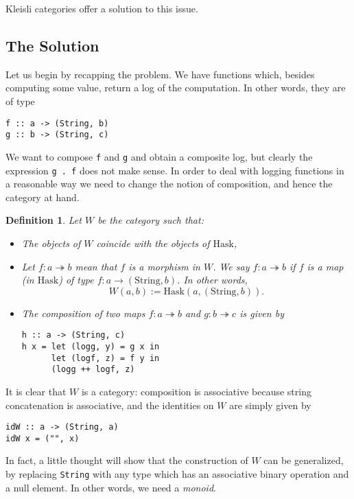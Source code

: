 \documentclass[11	pt]{article}
\newtheorem{definition}{Definition}
\theoremstyle{nonumberplain}
\newcommand{\Hask}{\mathrm{Hask}}
\newcommand{\type}[1]{\mathrm{#1}}
\newcommand*\lsin{\lstinline}
\begin{document}
Kleisli categories offer a solution to this issue.

\subsection{The Solution}

Let us begin by recapping the problem. We have functions which, besides computing some value, return a log of the computation. In other words, they are of type
\begin{lstlisting}
f :: a -> (String, b)
g :: b -> (String, c)
\end{lstlisting}

We want to compose \lsin|f| and \lsin|g| and obtain a composite log, but clearly the expression \lsin|g . f| does not make sense. In order to deal with logging functions in a reasonable way we need to change the notion of composition, and hence the category at hand.

\begin{definition}\label{def:kleisli}
Let $W$ be the category such that:
\begin{itemize}
\item The objects of $W$ coincide with the objects of $\Hask$,
\item Let $f \colon a \twoheadrightarrow b$ mean that $f$ is a morphism in $W$. We say $f \colon a \twoheadrightarrow b$ if $f$ is a map (in $\Hask$) of type $f \colon a \to (\type{String}, b)$. In other words,
\begin{equation}
W(a,b) := \Hask(a, (\type{String},b)).
\end{equation}
\item The composition of two maps $f \colon a \twoheadrightarrow b$ and $g \colon b \twoheadrightarrow c$ is given by
\begin{lstlisting}
h :: a -> (String, c)
h x = let (logg, y) = g x in
      let (logf, z) = f y in
      (logg ++ logf, z)
\end{lstlisting}
\end{itemize}
\end{definition}

It is clear that $W$ is a category: composition is associative because string concatenation is associative, and the identities on $W$ are simply given by
\begin{lstlisting}
idW :: a -> (String, a)
idW x = ("", x)
\end{lstlisting}

In fact, a little thought will show that the construction of $W$ can be generalized, by replacing \lsin|String| with any type which has an associative binary operation and a null element. In other words, we need a \emph{monoid}.
\end{document}
